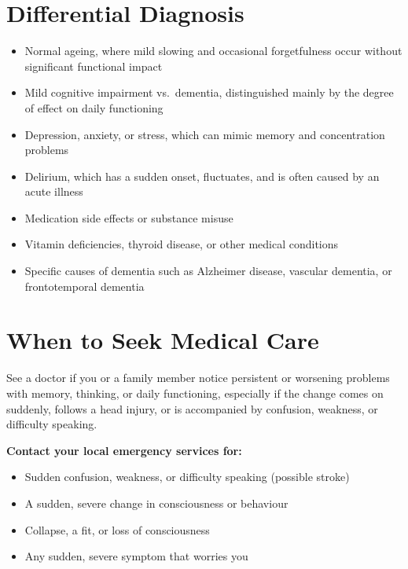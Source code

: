 \section*{Differential Diagnosis}
\begin{itemize}
    \item Normal ageing, where mild slowing and occasional forgetfulness occur without significant functional impact
    \item Mild cognitive impairment vs.\ dementia, distinguished mainly by the degree of effect on daily functioning
    \item Depression, anxiety, or stress, which can mimic memory and concentration problems
    \item Delirium, which has a sudden onset, fluctuates, and is often caused by an acute illness
    \item Medication side effects or substance misuse
    \item Vitamin deficiencies, thyroid disease, or other medical conditions
    \item Specific causes of dementia such as Alzheimer disease, vascular dementia, or frontotemporal dementia
\end{itemize}

\section*{When to Seek Medical Care}
See a doctor if you or a family member notice persistent or worsening problems with memory, thinking, or daily functioning, especially if the change comes on suddenly, follows a head injury, or is accompanied by confusion, weakness, or difficulty speaking.

\textbf{Contact your local emergency services for:}
\begin{itemize}
    \item Sudden confusion, weakness, or difficulty speaking (possible stroke)
    \item A sudden, severe change in consciousness or behaviour
    \item Collapse, a fit, or loss of consciousness
    \item Any sudden, severe symptom that worries you
\end{itemize}

